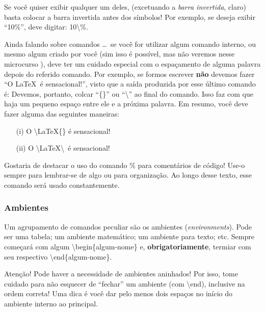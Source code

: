 Se você quiser exibir qualquer um deles, (excetuando a \textit{barra invertida},
claro) basta colocar a barra invertida antes dos símbolos!
Por exemplo, se deseja exibir ``10\%'', deve digitar: \textsf{10\textbackslash \%}.

Ainda falando sobre comandos \ldots\ se você for utilizar algum comando interno, 
ou mesmo algum criado por você (sim isso é possível, mas não veremos nesse 
microcurso ), deve ter um cuidado especial com o espaçamento 
de alguma palavra depois do referido comando.
Por exemplo, se formos escrever 
\textbf{não} devemos fazer ``\textsf{O \LaTeX\ é sensacional!}'', visto que a 
saída produzida por esse último comando é:
Devemos, portanto, colcar ``\textsf{\{\}}'' ou ``\textsf{\textbackslash}'' 
ao final do comando. 
Isso faz com que haja um pequeno espaço entre ele e a próxima palavra. 
Em resumo, você deve fazer alguma das seguintes maneiras:
\begin{enumerate}
  \item[(i)] \textsf{O \textbackslash LaTeX\{\} é sensacional!}
  \item[(ii)] \textsf{O \textbackslash LaTeX\textbackslash\ é sensacional!} 
\end{enumerate}

Gostaria de destacar o uso do comando \textsf{\%} para comentários de código! 
Use-o sempre para lembrar-se de algo ou para organização. 
Ao longo desse texto, esse comando será usado constantemente.

% 
  \subsubsection{Ambientes}
% 

Um agrupamento de comandos peculiar são os \textsf{ambientes} (\textit{environments}). 
Pode ser uma tabela; um ambiente matemático; um ambiente para texto; etc. 
Sempre começará com algum \textsf{\textbackslash begin\{algum-nome\}} e, 
\textbf{obrigatoriamente}, termiar com seu respectivo \textsf{\textbackslash end\{algum-nome\}}. 

\begin{atencao}{Atenção!}{\exclamacao}
  Pode haver a necessidade de ambientes aninhados!
  Por isso, tome cuidado para não esquecer de ``fechar'' um ambiente (com 
  \textsf{\textbackslash end}), inclusive na ordem correta!
  Uma dica é você dar pelo menos dois espaços no início do ambiente interno ao 
  principal.
\end{atencao}

